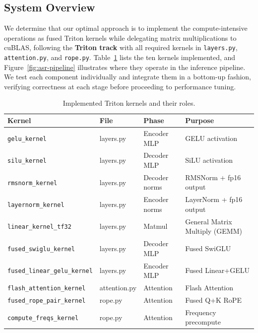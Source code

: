 \documentclass{article}
\begin{document}
\subsection{System Overview}

We determine that our optimal approach is to implement the compute-intensive operations as fused Triton kernels while delegating matrix multiplications to cuBLAS, following the \textbf{Triton track} with all required kernels in \texttt{layers.py}, \texttt{attention.py}, and \texttt{rope.py}.
Table~\ref{tab:kernels} lists the ten kernels implemented, and Figure~\ref{fig:asr-pipeline} illustrates where they operate in the inference pipeline.
We test each component individually and integrate them in a bottom-up fashion, verifying correctness at each stage before proceeding to performance tuning.

\begin{table}[h]
\centering
\caption{Implemented Triton kernels and their roles.}
\label{tab:kernels}
\small
\begin{tabular}{@{}llll@{}}
\toprule
\textbf{Kernel} & \textbf{File} & \textbf{Phase} & \textbf{Purpose} \\
\midrule
\texttt{gelu\_kernel} & layers.py & Encoder MLP & GELU activation \\
\texttt{silu\_kernel} & layers.py & Decoder MLP & SiLU activation \\
\texttt{rmsnorm\_kernel} & layers.py & Decoder norms & RMSNorm + fp16 output \\
\texttt{layernorm\_kernel} & layers.py & Encoder norms & LayerNorm + fp16 output \\
\texttt{linear\_kernel\_tf32} & layers.py & Matmul & General Matrix Multiply (GEMM) \\
\texttt{fused\_swiglu\_kernel} & layers.py & Decoder MLP & Fused SwiGLU \\
\texttt{fused\_linear\_gelu\_kernel} & layers.py & Encoder MLP & Fused Linear+GELU \\
\texttt{flash\_attention\_kernel} & attention.py & Attention & Flash Attention \\
\texttt{fused\_rope\_pair\_kernel} & rope.py & Attention & Fused Q+K RoPE \\
\texttt{compute\_freqs\_kernel} & rope.py & Attention & Frequency precompute \\
\bottomrule
\end{tabular}
\end{table}
\end{document}
